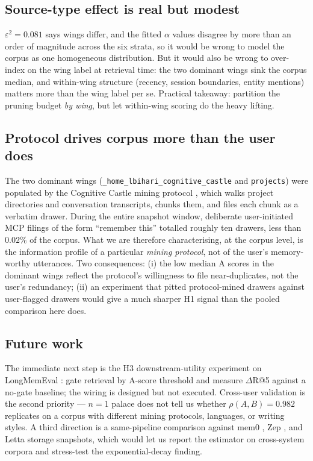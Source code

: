 \documentclass[11pt]{article}
\begin{document}
\subsection{Source-type effect is real but modest}
$\varepsilon^2 = 0.081$ says wings differ, and the fitted $\alpha$
values disagree by more than an order of magnitude across the six
strata, so it would be wrong to model the corpus as one homogeneous
distribution. But it would also be wrong to over-index on the wing
label at retrieval time: the two dominant wings sink the corpus
median, and within-wing structure (recency, session boundaries,
entity mentions) matters more than the wing label per se. Practical
takeaway: partition the pruning budget \emph{by wing}, but let
within-wing scoring do the heavy lifting.

\subsection{Protocol drives corpus more than the user does}
The two dominant wings
(\texttt{\_home\_lbihari\_cognitive\_castle} and \texttt{projects})
were populated by the Cognitive Castle mining protocol
\citep{cognitivecastle}, which walks project directories and
conversation transcripts, chunks them, and files each chunk as a
verbatim drawer. During the entire snapshot window, deliberate
user-initiated MCP filings of the form ``remember this'' totalled
roughly ten drawers, less than $0.02\%$ of the corpus. What we are
therefore characterising, at the corpus level, is the information
profile of a particular \emph{mining protocol}, not of the user's
memory-worthy utterances. Two consequences: (i) the low median A
scores in the dominant wings reflect the protocol's willingness to
file near-duplicates, not the user's redundancy; (ii) an experiment
that pitted protocol-mined drawers against user-flagged drawers
would give a much sharper H1 signal than the pooled comparison here
does.

\subsection{Future work}
The immediate next step is the H3 downstream-utility experiment on
LongMemEval \citep{longmemeval}: gate retrieval by A-score threshold
and measure $\Delta$R@5 against a no-gate baseline; the wiring is
designed but not executed. Cross-user validation is the second
priority --- $n = 1$ palace does not tell us whether $\rho(A, B) =
0.982$ replicates on a corpus with different mining protocols,
languages, or writing styles. A third direction is a same-pipeline
comparison against mem0 \citep{mem0site}, Zep \citep{zepsite}, and
Letta \citep{lettasite} storage snapshots, which would let us
report the estimator on cross-system corpora and stress-test the
exponential-decay finding.
\end{document}

